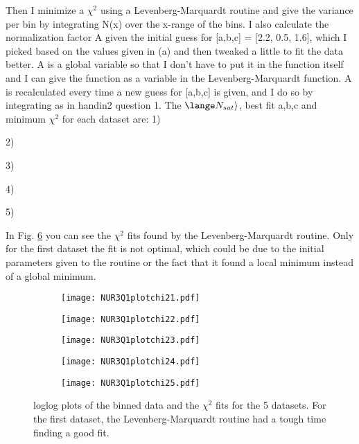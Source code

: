 {Then I minimize a $\chi^2$ using a Levenberg-Marquardt routine and give the variance per bin by integrating N(x) 
over the x-range of the bins. I also calculate the normalization factor A given the initial guess for [a,b,c] =
[2.2, 0.5, 1.6], which I picked based on the values given in (a) and then tweaked a little to fit the data better.
A is a global variable so that I don't have to put it in the function itself and I can give the function as a variable
in the Levenberg-Marquardt function. A is recalculated every time a new guess for [a,b,c] is given, and I do so
by integrating as in handin2 question 1. 
The $\lange N_{sat} \rangle$, best fit a,b,c and minimum $\chi^2$ for each dataset are: 1)

2)

3)

4)

5)


In Fig. \ref{fig:fig2} you can see the $\chi^2$ fits found by the Levenberg-Marquardt routine. Only for the first dataset the fit is not optimal, which could be due to the initial parameters given to the routine or the fact that it found a local minimum instead of a global minimum. 

\begin{figure}[ht]
    \begin{subfigure}{.49\textwidth}
       \centering
    \texttt{[image: NUR3Q1plotchi21.pdf]}
    \centering
    \subcaption{}
    \label{}
    \end{subfigure}
    \hfill
    \begin{subfigure}{.49\textwidth}
       \centering
    \texttt{[image: NUR3Q1plotchi22.pdf]}
    \centering
    \subcaption{}
    \label{}
    \end{subfigure}
     \begin{subfigure}{.49\textwidth}
       \centering
    \texttt{[image: NUR3Q1plotchi23.pdf]}
    \centering
    \subcaption{}
    \label{}
    \end{subfigure}
     \begin{subfigure}{.49\textwidth}
       \centering
    \texttt{[image: NUR3Q1plotchi24.pdf]}
    \centering
    \subcaption{}
    \label{}
    \end{subfigure}
     \begin{subfigure}{.49\textwidth}
       \centering
    \texttt{[image: NUR3Q1plotchi25.pdf]}
    \centering
    \subcaption{}
    \label{}
    \end{subfigure}
    \caption{loglog plots of the binned data and the $\chi^2$ fits for the 5 datasets. For the first dataset, the Levenberg-Marquardt routine had a tough time finding a good fit.}
    \label{fig:fig2}
\end{figure}


}
